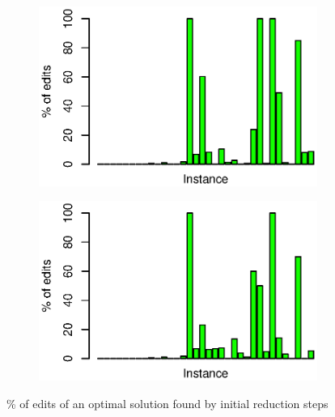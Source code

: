 \documentclass[12pt,oneside,english,parskip=full,headings=small]{scrbook}
\theoremstyle{definition}
\begin{document}
\begin{figure}[h]
	\begin{subfigure}{0.49\textwidth}
		\includegraphics[width=1.0\linewidth]{percent_edits_full}
	\end{subfigure}
	\begin{subfigure}{0.49\textwidth}
		\includegraphics[width=1.0\linewidth]{percent_edits_rules1-5}
	\end{subfigure}
	\caption{\% of edits of an optimal solution found by initial reduction steps}
	\label{fig:edits from reduction}
\end{figure}
\end{document}
